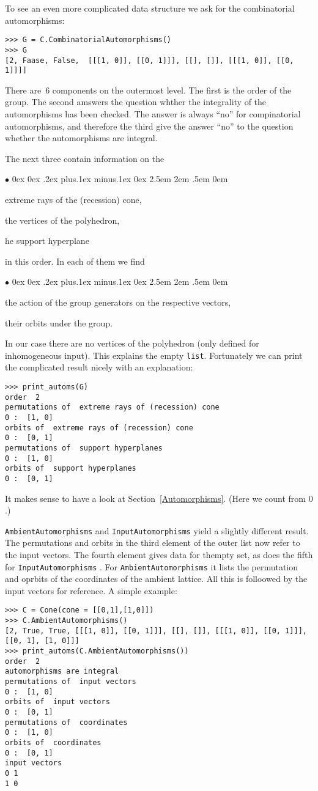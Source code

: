 \documentclass[12pt,a4paper]{scrartcl}
\newcommand{\stdli}{ \topsep0ex \partopsep0ex %
\parsep.2ex plus.1ex minus.1ex \itemsep0ex%
\leftmargin2.5em \labelwidth2em \labelsep.5em \rightmargin0em}%
\renewenvironment{itemize}{\begin{list}{{$\bullet$}}{\stdli}}{\end{list}}
\theoremstyle{definition}
\def\ttt{\texttt}
\begin{document}
\begin{small}
To see an even more complicated data structure we ask for the combinatorial automorphisms:
\begin{Verbatim}
>>> G = C.CombinatorialAutomorphisms()
>>> G
[2, Faase, False,  [[[1, 0]], [[0, 1]]], [[], []], [[[1, 0]], [[0, 1]]]]
\end{Verbatim}
There are~$6$ components on the outermost level. The first is the order of the group. The second amswers the question whther the integrality of the automorphisms has been checked. The answer is always ``no'' for compinatorial automorphisms, and therefore the third give the answer ``no'' to the question whether the automorphisms are integral.

The next three contain information on the
\begin{itemize}
	\item extreme rays of the (recession) cone,
	\item the vertices of the polyhedron,
	\item he support hyperplane
\end{itemize}
in this order. In each of them we find
\begin{itemize}
	\item the action of the group generators on the respective vectors,
	\item their orbits under the group.
\end{itemize}
In our case there are no vertices of the polyhedron (only defined for inhomogeneous input). This explains the empty \verb|list|. Fortunately we can print the complicated result nicely with an explanation:
\begin{Verbatim}
>>> print_automs(G)
order  2
permutations of  extreme rays of (recession) cone
0 :  [1, 0]
orbits of  extreme rays of (recession) cone
0 :  [0, 1]
permutations of  support hyperplanes
0 :  [1, 0]
orbits of  support hyperplanes
0 :  [0, 1]
\end{Verbatim}
It makes sense to have a look at Section~\ref{Automorphisms}. (Here we count from $0$.)

\ttt{AmbientAutomorphisms} and \ttt{InputAutomorphisms} yield a slightly different result. The permutations and orbits in the third element of the outer list now refer to the input vectors. The fourth element gives data for thempty set, as does the fifth for \ttt{InputAutomorphisms} . For \ttt{AmbientAutomorphisms} it lists the permutation and oprbits of the coordinates of the ambient lattice. All this is folloowed by the input vectors for reference. A simple example:
\begin{Verbatim}
>>> C = Cone(cone = [[0,1],[1,0]])
>>> C.AmbientAutomorphisms()
[2, True, True, [[[1, 0]], [[0, 1]]], [[], []], [[[1, 0]], [[0, 1]]], [[0, 1], [1, 0]]]
>>> print_automs(C.AmbientAutomorphisms())
order  2
automorphisms are integral
permutations of  input vectors
0 :  [1, 0]
orbits of  input vectors
0 :  [0, 1]
permutations of  coordinates
0 :  [1, 0]
orbits of  coordinates
0 :  [0, 1]
input vectors
0 1
1 0
\end{Verbatim}
 

\end{small}
\end{document}
